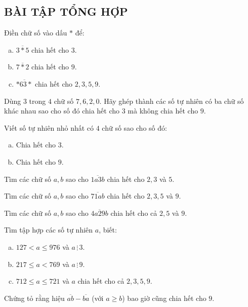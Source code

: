 \begin{bt}
\subsection{BÀI TẬP TỔNG HỢP}
\end{bt}   \begin{bt} Điền chữ số vào dấu ${*}$ để:
\begin{enumerate}[a)]
\item $\overline {3*5}$ chia hết cho $3$. 
\item $\overline {7*2}$ chia hết cho $9$.
\item $\overline {*63*}$ chia hết cho $2, 3, 5, 9$.  
\end{enumerate}
\end{bt}   \begin{bt} 
Dùng $3$ trong $4$ chữ số $7, 6, 2, 0$. Hãy ghép thành các số tự nhiên có ba chữ số khác nhau sao cho số đó chia hết cho $3$ mà không chia hết cho $9$.
\end{bt}   \begin{bt}
Viết số tự nhiên nhỏ nhất có $4$ chữ số sao cho số đó:
\begin{enumerate}[a)]
\item Chia hết cho $3$.
\item Chia hết cho $9$.
\end{enumerate}   
\end{bt}   \begin{bt}
Tìm các chữ số $a, b$ sao cho $\overline {1a3b}$ chia hết cho $2, 3$ và $5$.
\end{bt}   \begin{bt}
Tìm các chữ số $a, b$ sao cho $\overline {71ab}$ chia hết cho $2, 3 , 5$ và $9$.
\end{bt}   \begin{bt}
Tìm các chữ số $a, b$ sao cho $\overline {4a29b}$ chia hết cho cả $2, 5$ và $9$.
\end{bt}   \begin{bt}
Tìm tập hợp các số tự nhiên $a$, biết:
\begin{enumerate}[a)]
\item $127 < a \le 976$ và $a \,\vdots \,3$.
\item $217 \le a < 769$ và $a \,\vdots \,9$.
\item $712 \le a \le 721$ và $a$ chia hết cho cả $2, 3, 5, 9$.
\end{enumerate}  
\end{bt}   \begin{bt}
Chứng tỏ rằng hiệu $\overline {ab} - \overline {ba}$ (với $a \ge b$) bao giờ cũng chia hết cho $9$.

\end{bt}
